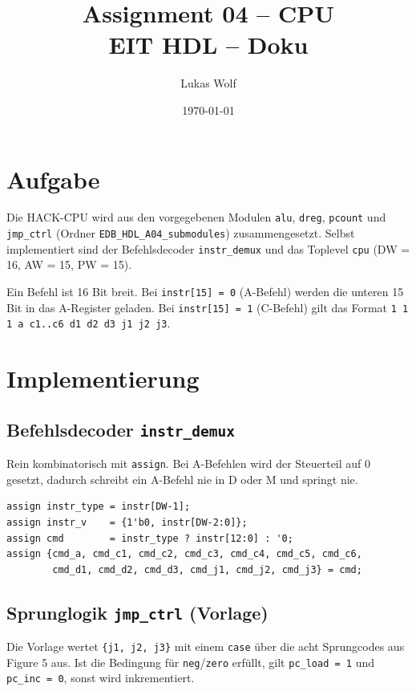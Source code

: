 \documentclass[11pt,a4paper]{article}
\title{Assignment 04 -- CPU\\\large EIT HDL -- Doku}
\author{Lukas Wolf}
\date{\today}
\begin{document}
\maketitle

\section{Aufgabe}
Die HACK-CPU wird aus den vorgegebenen Modulen \texttt{alu}, \texttt{dreg}, \texttt{pcount}
und \texttt{jmp\_ctrl} (Ordner \texttt{EDB\_HDL\_A04\_submodules}) zusammengesetzt. Selbst
implementiert sind der Befehlsdecoder \texttt{instr\_demux} und das Toplevel \texttt{cpu}
(DW = 16, AW = 15, PW = 15).

Ein Befehl ist 16 Bit breit. Bei \texttt{instr[15] = 0} (A-Befehl) werden die unteren 15 Bit
in das A-Register geladen. Bei \texttt{instr[15] = 1} (C-Befehl) gilt das Format
\texttt{1 1 1 a c1..c6 d1 d2 d3 j1 j2 j3}.

\section{Implementierung}

\subsection*{Befehlsdecoder \texttt{instr\_demux}}
Rein kombinatorisch mit \texttt{assign}. Bei A-Befehlen wird der Steuerteil auf 0 gesetzt,
dadurch schreibt ein A-Befehl nie in D oder M und springt nie.
\begin{lstlisting}[language=SV]
assign instr_type = instr[DW-1];
assign instr_v    = {1'b0, instr[DW-2:0]};
assign cmd        = instr_type ? instr[12:0] : '0;
assign {cmd_a, cmd_c1, cmd_c2, cmd_c3, cmd_c4, cmd_c5, cmd_c6,
        cmd_d1, cmd_d2, cmd_d3, cmd_j1, cmd_j2, cmd_j3} = cmd;
\end{lstlisting}

\subsection*{Sprunglogik \texttt{jmp\_ctrl} (Vorlage)}
Die Vorlage wertet \texttt{\{j1, j2, j3\}} mit einem \texttt{case} über die acht Sprungcodes
aus Figure 5 aus. Ist die Bedingung für \texttt{neg}/\texttt{zero} erfüllt, gilt
\texttt{pc\_load = 1} und \texttt{pc\_inc = 0}, sonst wird inkrementiert.
\end{document}
